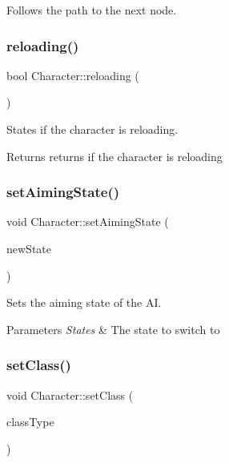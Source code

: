 Follows the path to the next node. 

\mbox{\label{class_character_ad92a87727c942a1ff05e09cceaca1398}} 
\subsubsection{\texorpdfstring{reloading()}{reloading()}}
{\footnotesize\ttfamily bool Character\+::reloading (\begin{DoxyParamCaption}{ }\end{DoxyParamCaption})}



States if the character is reloading. 

\begin{DoxyReturn}{Returns}
returns if the character is reloading 
\end{DoxyReturn}
\mbox{\label{class_character_a4fdc243fc7681fa8fd8dec2cbed595fe}} 
\subsubsection{\texorpdfstring{set\+Aiming\+State()}{setAimingState()}}
{\footnotesize\ttfamily void Character\+::set\+Aiming\+State (\begin{DoxyParamCaption}\item[{\hyperlink{_character_8h_a808e5cd4979462d3bbe3070d7d147444}{States}}]{new\+State }\end{DoxyParamCaption})}



Sets the aiming state of the AI. 


\begin{DoxyParams}{Parameters}
{\em States} & The state to switch to \\
\hline
\end{DoxyParams}
\mbox{\label{class_character_a87ea11fe81e35a6efb7d465b01b10332}} 
\subsubsection{\texorpdfstring{set\+Class()}{setClass()}}
{\footnotesize\ttfamily void Character\+::set\+Class (\begin{DoxyParamCaption}\item[{\hyperlink{_weapon_8h_ab84a9103ee8e782337e098ae19af7a29}{class\+Type}}]{class\+Type }\end{DoxyParamCaption})}



